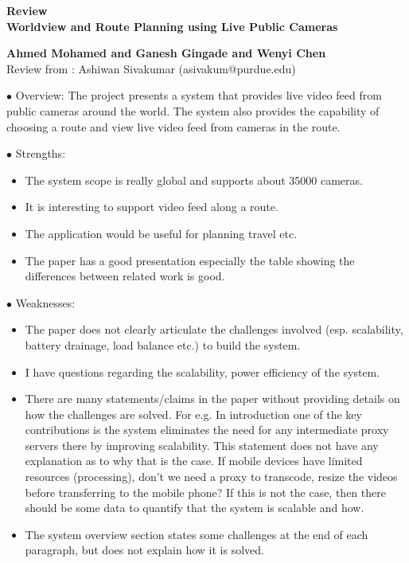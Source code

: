 \documentclass[a4paper, 12pt]{article}
\begin{document}
\thispagestyle{fancy}
\lhead{}
\rhead{}
\renewcommand{\headrulewidth}{0pt} 
\renewcommand{\footrulewidth}{0pt} 
\rhead{\textcolor{gray}{\thepage/\totalpages{}}}
\begin{center}
{\LARGE \bf Review}\\
\vspace*{0.1cm}
{\LARGE \bf Worldview and Route Planning using Live Public Cameras}\\
\vspace*{0.1cm}

{\bf Ahmed Mohamed and Ganesh Gingade and Wenyi Chen}\\

\vspace*{0.1cm}
{\normalsize Review from : Ashiwan Sivakumar (asivakum@purdue.edu)}

\noindent$\bullet$ Overview:
The project presents a system that provides live video feed from public cameras around the world.
The system also provides the capability of choosing a route and view live video feed from cameras in the route.

\noindent$\bullet$ Strengths:
\begin{itemize}
\item The system scope is really global and supports about 35000 cameras.
\item It is interesting to support video feed along a route. 
\item The application would be useful for planning travel etc.
\item The paper has a good presentation especially the table showing the differences between related work is good.
\end{itemize}

\noindent$\bullet$ Weaknesses:
\begin{itemize}
\item The paper does not clearly articulate the challenges involved (esp. scalability, battery drainage, load balance etc.) to build the system. 
\item I have questions regarding the scalability, power efficiency of the system.  
\item There are many statements/claims in the paper without providing details on how the challenges are solved.
For e.g. In introduction one of the key contributions is the system eliminates the need for any intermediate proxy servers there by improving scalability. This statement does not have any explanation as to why that is the case. If mobile devices have limited resources (processing), don't we need a proxy to transcode, resize the videos before transferring to the mobile phone? If this is not the case, then there should be some data to quantify that the system is scalable and how. 
\item The system overview section states some challenges at the end of each paragraph, but does not explain how it is solved. 
\end{itemize}


\end{center}
\end{document}
